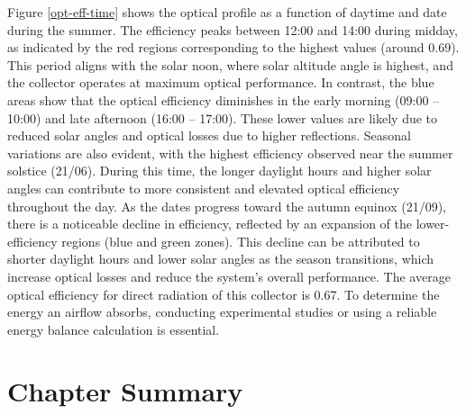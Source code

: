 \newpage
Figure \ref{opt-eff-time} shows the optical profile as a function of daytime and date during the summer. The efficiency peaks between 12:00 and 14:00 during midday, as indicated by the red regions corresponding to the highest values (around 0.69). This period aligns with the solar noon, where solar altitude angle is highest, and the collector operates at maximum  optical performance. In contrast, the blue areas show that the optical efficiency diminishes in the early morning (09:00 -- 10:00) and late afternoon (16:00 -- 17:00). These lower values are likely due to reduced solar angles and optical losses due to higher reflections. Seasonal variations are also evident, with the highest efficiency observed near the summer solstice (21/06). During this time, the longer daylight hours and higher solar angles can contribute to more consistent and elevated optical efficiency throughout the day. As the dates progress toward the autumn equinox (21/09), there is a noticeable decline in efficiency, reflected by an expansion of the lower-efficiency regions (blue and green zones). This decline can be attributed to shorter daylight hours and lower solar angles as the season transitions, which increase optical losses and reduce the system's overall performance. The average optical efficiency for direct radiation of this collector is 0.67. To determine the energy an airflow absorbs, conducting experimental studies or using a reliable energy balance calculation is essential.


\section{Chapter Summary}


